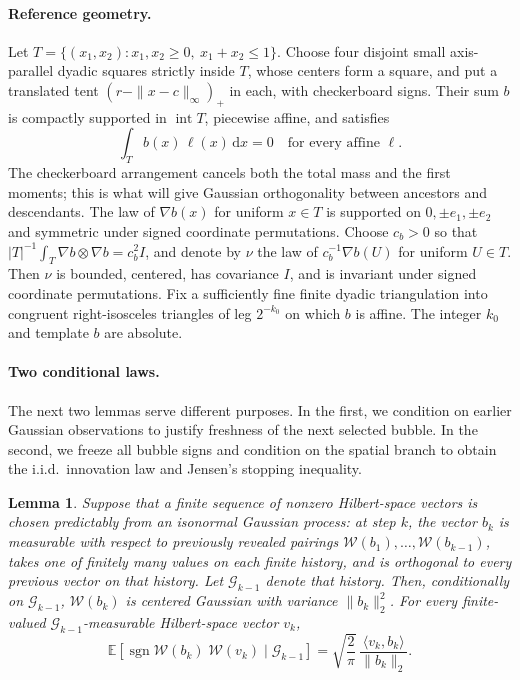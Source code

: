 \documentclass[11pt]{article}
\newtheorem{lemma}[lemma]{Lemma}
\theoremstyle{definition}
\theoremstyle{remark}
\numberwithin{equation}{section}
\begin{document}
\paragraph{Reference geometry.}
Let $T=\{(x_1,x_2):x_1,x_2\ge0,\ x_1+x_2\le1\}$. Choose four
disjoint small axis-parallel dyadic squares strictly inside $T$,
whose centers form a square, and put a translated tent
$(r-\|x-c\|_\infty)_+$ in each, with checkerboard signs. Their sum
$b$ is compactly supported in $\operatorname{int}T$, piecewise affine,
and satisfies
\begin{equation}\label{neg:eq:affine-moments}
  \int_T b(x)\,\ell(x)\,\mathrm dx=0
  \quad\text{for every affine }\ell.
\end{equation}
The checkerboard arrangement cancels both the total mass and the first
moments; this is what will give Gaussian orthogonality between
ancestors and descendants. The law of $\nabla b(x)$ for uniform
$x\in T$ is supported on
$0,\pm e_1,\pm e_2$ and symmetric under signed coordinate
permutations. Choose $c_b>0$ so that
$|T|^{-1}\int_T\nabla b\otimes\nabla b=c_b^2 I$, and denote by
$\nu$ the law of $c_b^{-1}\nabla b(U)$ for uniform $U\in T$.
Then $\nu$ is bounded, centered, has covariance $I$, and is invariant
under signed coordinate permutations. Fix a sufficiently fine finite
dyadic triangulation into congruent right-isosceles triangles
of leg $2^{-k_0}$ on which $b$ is affine. The integer $k_0$ and
template $b$ are absolute.

\paragraph{Two conditional laws.}
The next two lemmas serve different purposes. In the first,
we condition on earlier Gaussian observations to justify
freshness of the next selected bubble. In the second, we freeze all
bubble signs and condition on the spatial branch to obtain the
i.i.d.\ innovation law and Jensen's stopping inequality.

\begin{lemma}
\label{neg:lem:fresh}
Suppose that a finite sequence of nonzero Hilbert-space vectors
is chosen predictably from an isonormal Gaussian process: at step $k$, the vector $b_k$ is
measurable with respect to previously revealed pairings
$\mathcal W(b_1),\dots,\mathcal W(b_{k-1})$, takes one of finitely
many values on each finite history, and is orthogonal to every
previous vector on that history. Let $\mathcal G_{k-1}$ denote that
history. Then, conditionally on $\mathcal G_{k-1}$,
$\mathcal W(b_k)$ is centered Gaussian with variance $\|b_k\|_2^2$.
For every finite-valued $\mathcal G_{k-1}$-measurable Hilbert-space
vector $v_k$,
\begin{equation}\label{neg:eq:conditional-sign}
 \mathbb E\left[\operatorname{sgn}\mathcal W(b_k)
                    \;\mathcal W(v_k)\mid\mathcal G_{k-1}\right]
 =\sqrt{\frac2\pi}\,
     \frac{\langle v_k,b_k\rangle}{\|b_k\|_2}.
\end{equation}
\end{lemma}
\end{document}
